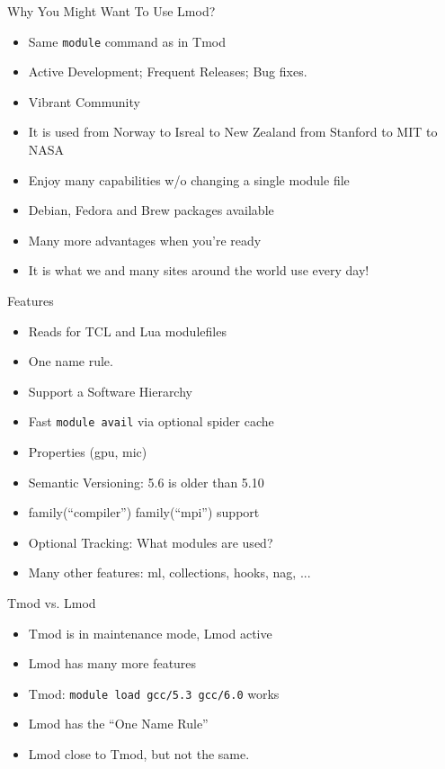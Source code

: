 \documentclass[dvipsnames,aspectratio=169]{beamer}
\begin{document}
\begin{frame}{Why You Might Want To Use Lmod?}
  \begin{itemize}
    \item Same \texttt{module} command as in Tmod
    \item Active Development;  Frequent Releases; Bug fixes.
    \item Vibrant Community
    \item It is used from Norway to Isreal to New Zealand from Stanford to MIT to NASA
    \item Enjoy many capabilities w/o changing a single module file
    \item Debian, Fedora and Brew packages available
    \item Many more advantages when you're ready
    \item It is what we and many sites around the world use every day!
  \end{itemize}
\end{frame}

\begin{frame}{Features}
  \begin{itemize}
    \item Reads for TCL and Lua modulefiles
    \item One name rule.
    \item Support a Software Hierarchy
    \item Fast \texttt{module avail} via optional spider cache 
    \item Properties (gpu, mic)
    \item Semantic Versioning:  5.6 is older than 5.10
    \item family(``compiler'') family(``mpi'') support
    \item Optional Tracking: What modules are used?
    \item Many other features: ml, collections, hooks, nag, ...
  \end{itemize}
\end{frame}

\begin{frame}{Tmod vs. Lmod}
  \begin{itemize}
    \item Tmod is in maintenance mode, Lmod active
    \item Lmod has many more features
    \item Tmod: \texttt{module load gcc/5.3 gcc/6.0} works
    \item Lmod has the ``One Name Rule''
    \item Lmod close to Tmod, but not the same.
  \end{itemize}
\end{frame}
\end{document}
